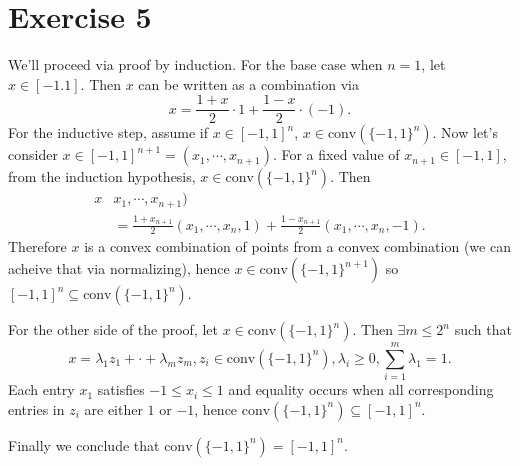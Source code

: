 \newpage
\section*{Exercise 5}
We'll proceed via proof by induction. For the base case when $n = 1$, let $x \in [-1. 1]$. Then $x$ can be written 
as a combination via 
\[ x = \frac{1 + x}{2} \cdot 1 + \frac{1 - x}{2} \cdot (-1). \]
For the inductive step, assume if $x \in [-1, 1]^n$, $x \in \text{conv}(\{ -1, 1 \}^n)$. Now let's consider 
$x \in [-1, 1]^{n + 1} = (x_1, \cdots, x_{n + 1})$. For a fixed value of $x_{n + 1} \in [-1, 1]$, from the 
induction hypothesis, $x \in \text{conv}(\{ -1, 1 \}^n)$. Then 
\begin{align*}
	x 
	&x_1, \cdots, x_{n + 1}) \\
	&= \frac{1 + x_{n + 1}}{2}(x_1, \cdots, x_n, 1) + \frac{1 - x_{n + 1}}{2}(x_1, \cdots, x_n, -1).
\end{align*}
Therefore $x$ is a convex combination of points from a convex combination (we can acheive that via normalizing), hence 
$x \in \text{conv}(\{ -1, 1 \}^{n + 1})$ so $[-1,1]^n \subseteq \text{conv}(\{-1, 1\}^n)$.

For the other side of the proof, let $x \in \text{conv}(\{ -1, 1 \}^n)$. Then $\exists m \leq 2^n$ such that 
\[ x = \lambda_1 z_1 + \cdot + \lambda_m z_m, z_i \in \text{conv}(\{ -1, 1 \}^n), \lambda_i \geq 0, 
\sum_{i = 1}^{m} \lambda_1 = 1. \]
Each entry $x_1$ satisfies $-1 \leq x_i \leq 1$ and equality occurs when all corresponding entries in $z_i$ are 
either $1$ or $-1$, hence $\text{conv}(\{-1, 1\}^n) \subseteq [-1, 1]^n$.

Finally we conclude that $\text{conv}(\{-1, 1\}^n) = [-1, 1]^n$.


\newpage
